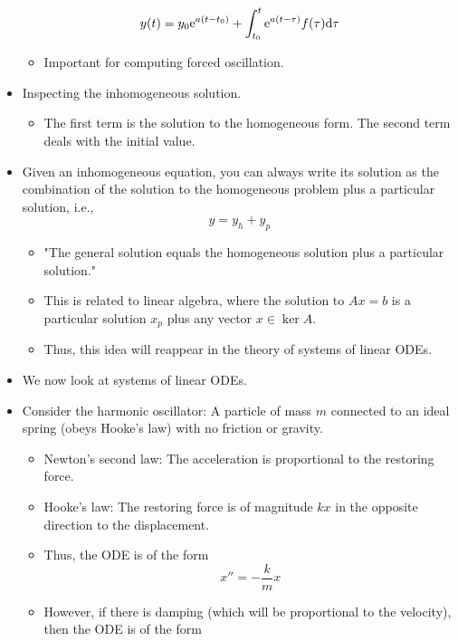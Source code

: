 \documentclass[../notes.tex]{subfiles}
\begin{document}
\begin{itemize}
    \begin{equation*}
        y(t) = y_0\e[a(t-t_0)]+\int_{t_0}^t\e[a(t-\tau)]f(\tau)\dd\tau
    \end{equation*}
    \begin{itemize}
        \item Important for computing forced oscillation.
    \end{itemize}
    \item Inspecting the inhomogeneous solution.
    \begin{itemize}
        \item The first term is the solution to the homogeneous form. The second term deals with the initial value.
    \end{itemize}
    \item Given an inhomogeneous equation, you can always write its solution as the combination of the solution to the homogeneous problem plus a particular solution, i.e.,
    \begin{equation*}
        y = y_h+y_p
    \end{equation*}
    \begin{itemize}
        \item "The general solution equals the homogeneous solution plus a particular solution."
        \item This is related to linear algebra, where the solution to $Ax=b$ is a particular solution $x_p$ plus any vector $x\in\ker A$.
        \item Thus, this idea will reappear in the theory of systems of linear ODEs.
    \end{itemize}
    \item We now look at systems of linear ODEs.
    \item Consider the harmonic oscillator: A particle of mass $m$ connected to an ideal spring (obeys Hooke's law) with no friction or gravity.
    \begin{itemize}
        \item Newton's second law: The acceleration is proportional to the restoring force.
        \item Hooke's law: The restoring force is of magnitude $kx$ in the opposite direction to the displacement.
        \item Thus, the ODE is of the form
        \begin{equation*}
            x'' = -\frac{k}{m}x
        \end{equation*}
        \item However, if there is damping (which will be proportional to the velocity), then the ODE is of the form

\end{itemize}
\end{itemize}
\end{document}
